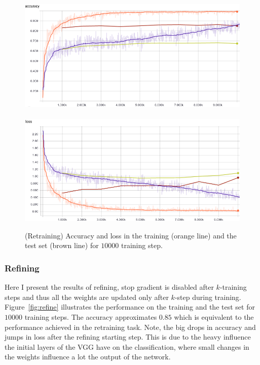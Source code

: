 \documentclass{article}
\begin{document}
\begin{figure}[h!]
\centering
\includegraphics[width=12.2cm]{acc-retrain.png}\	
\includegraphics[width=12.2cm]{loss-retrain.png}
\caption{(Retraining) Accuracy and loss in the training (orange line) and the test set (brown line) for $10000$ training step.}
\label{fig:retrain}
\end{figure}


\subsubsection{Refining}

Here I present the results of refining, stop gradient is disabled after $k$-training steps and thus all the weights are updated only after $k$-step during training.
Figure~\ref{fig:refine} illustrates the performance on the training and the test set for $10000$ training steps.
The accuracy approximates $0.85$ which is equivalent to the performance achieved in the retraining task.
Note, the big drops in accuracy and jumps in loss after the refining starting step.
This is due to the heavy influence the initial layers of the VGG have on the classification, where small changes in the weights influence a lot the output of the network.
\end{document}
